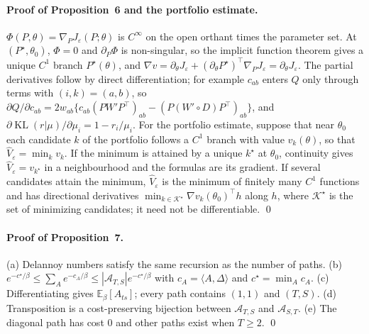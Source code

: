 \documentclass[12pt]{article}
\newcommand{\KL}{\operatorname{KL}}
\begin{document}
\paragraph{Proof of Proposition~6 and the portfolio estimate.}
$\Phi(P,\theta)=\nabla_PJ_\varepsilon(P;\theta)$ is $C^\infty$ on the open orthant times the parameter set. At $(P^\star,\theta_0)$, $\Phi=0$ and $\partial_P\Phi$ is non-singular, so the implicit function theorem gives a unique $C^1$ branch $P^\star(\theta)$, and $\nabla v=\partial_\theta J_\varepsilon+(\partial_\theta P^\star)^\top\nabla_PJ_\varepsilon=\partial_\theta J_\varepsilon$. The partial derivatives follow by direct differentiation; for example $c_{ab}$ enters $Q$ only through terms with $(i,k)=(a,b)$, so $\partial Q/\partial c_{ab}=2w_{ab}\{c_{ab}(PW'P^\top)_{ab}-(P(W'\circ D)P^\top)_{ab}\}$, and $\partial\KL(r|\mu)/\partial\mu_i=1-r_i/\mu_i$. For the portfolio estimate, suppose that near $\theta_0$ each candidate $k$ of the portfolio follows a $C^1$ branch with value $v_k(\theta)$, so that $\widehat V_\varepsilon=\min_kv_k$. If the minimum is attained by a unique $k^\star$ at $\theta_0$, continuity gives $\widehat V_\varepsilon=v_{k^\star}$ in a neighbourhood and the formulas are its gradient. If several candidates attain the minimum, $\widehat V_\varepsilon$ is the minimum of finitely many $C^1$ functions and has directional derivatives $\min_{k\in\mathcal K^\star}\nabla v_k(\theta_0)^\top h$ along $h$, where $\mathcal K^\star$ is the set of minimizing candidates; it need not be differentiable. \qed


\paragraph{Proof of Proposition~7.}
(a) Delannoy numbers satisfy the same recursion as the number of paths. (b) $e^{-c^\star/\beta}\le\sum_Ae^{-c_A/\beta}\le|\mathcal A_{T,S}|e^{-c^\star/\beta}$ with $c_A=\langle A,\Delta\rangle$ and $c^\star=\min_Ac_A$. (c) Differentiating gives $\mathbb E_\beta[A_{ts}]$; every path contains $(1,1)$ and $(T,S)$. (d) Transposition is a cost-preserving bijection between $\mathcal A_{T,S}$ and $\mathcal A_{S,T}$. (e) The diagonal path has cost $0$ and other paths exist when $T\ge2$. \qed
\end{document}
